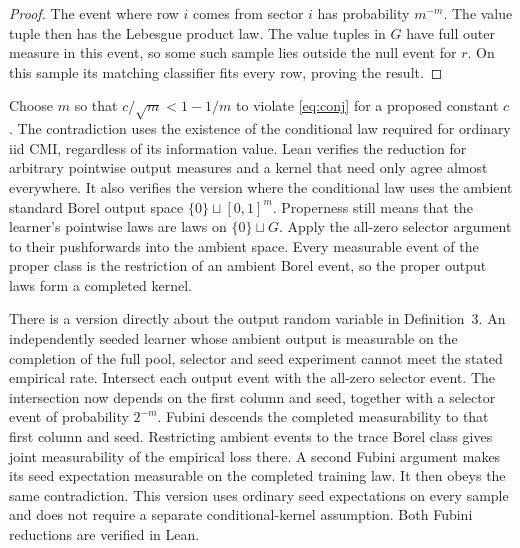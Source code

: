 \documentclass[11pt]{article}
\theoremstyle{definition}\newtheorem{definition}[theorem]{Definition}
\begin{document}
\begin{proof}
The event where row $i$ comes from sector $i$ has probability $m^{-m}$.
The value tuple then has the Lebesgue product law. The value tuples in
$G$ have full outer measure in this event, so some such sample lies
outside the null event for $r$. On this sample its matching classifier
fits every row, proving the result.
\end{proof}

Choose $m$ so that $c/\sqrt m<1-1/m$ to violate \eqref{eq:conj} for a
proposed constant $c$. The contradiction uses the existence of the
conditional law required for ordinary iid CMI, regardless of its
information value. Lean verifies the reduction for arbitrary pointwise
output measures and a kernel that need only agree almost everywhere.
It also verifies the version where the conditional law uses the ambient
standard Borel output space $\{0\}\sqcup[0,1]^m$. Properness still means
that the learner's pointwise laws are laws on $\{0\}\sqcup G$. Apply the
all-zero selector argument to their pushforwards into the ambient space.
Every measurable event of the proper class is the restriction of an
ambient Borel event, so the proper output laws form a completed kernel.

There is a version directly about the output random variable in
Definition~3. An independently seeded learner whose ambient output is
measurable on the completion of the full pool, selector and seed
experiment cannot meet the stated empirical rate. Intersect each output
event with the all-zero selector event. The intersection now depends on
the first column and seed, together with a selector event of probability
$2^{-m}$. Fubini descends the completed measurability to that first column
and seed. Restricting ambient events to the trace Borel class gives joint
measurability of the empirical loss there. A second Fubini argument makes
its seed expectation measurable on the completed training law. It then
obeys the same contradiction. This version uses ordinary seed expectations
on every sample and does not require a separate conditional-kernel
assumption. Both Fubini reductions are verified in Lean.
\end{document}
